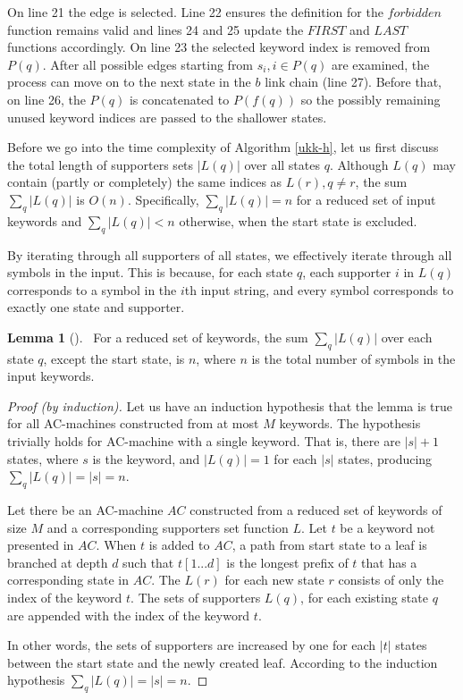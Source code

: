 \documentclass[english,twoside,censored,csm,algorithms-track-2020]{HYthesisML}
\theoremstyle{plain}
\theoremstyle{definition}
\newtheorem{lemma}[theorem]{Lemma}
\begin{document}
On line 21 the edge is selected. Line 22 ensures the definition for the $forbidden$ function
remains valid and lines 24 and 25 update the $FIRST$ and $LAST$ functions accordingly.
On line 23 the selected keyword index is removed from $P(q)$.
After all possible edges starting from
$s_i, i\in {P(q)}$ are examined, the process can move on to the next state in the $b$ link chain (line 27).
Before that, on line 26, the $P(q)$ is concatenated to $P(f(q))$ so the possibly remaining unused
keyword indices are passed to the shallower states.

Before we go into the time complexity of Algorithm \ref{ukk-h}, let us first discuss the
total length of supporters sets $|L(q)|$ over all states $q$. Although $L(q)$ may contain
(partly or completely)
the same indices as $L(r), q\neq r$, the sum $\sum_q |L(q)|$ is $O(n)$. Specifically,
$\sum_q |L(q)| = n$ for a reduced set of input keywords and $\sum_q |L(q)| < n$ otherwise,
when the start state is excluded.

By iterating
through all supporters of all states, we effectively iterate through all symbols
in the input. This is because, for each state $q$, each supporter $i$ in $L(q)$ corresponds to a
symbol in the $i$th input string, and every symbol corresponds to exactly one state and supporter.

\begin{lemma}[]~\label{lem-supporters}
  For a reduced set of keywords, the sum $\sum_q |L(q)|$ over each state $q$, except the start state,
  is $n$, where $n$ is the
  total number of symbols in the input keywords.
\end{lemma}
\begin{proof}[Proof (by induction)]
  Let us have an induction hypothesis that the lemma is true for all AC-machines constructed from 
  at most $M$ keywords. The hypothesis trivially holds for AC-machine with a single keyword. That is,
  there are $|s|+1$ states, where $s$ is the keyword, and $|L(q)| = 1$ for each $|s|$ states,
  producing $\sum_q |L(q)| = |s| = n$.

  Let there be an AC-machine $AC$ constructed from a reduced set of keywords of size $M$ and a
  corresponding supporters set function $L$. Let $t$ be a keyword not presented in $AC$.
  When $t$ is added to $AC$, a path from start state to a leaf is branched at depth $d$ such that
  $t[1...d]$ is the longest prefix of $t$ that has a corresponding state in $AC$. The $L(r)$ for
  each new state $r$ consists of only the index of the keyword $t$. The sets of supporters $L(q)$,
  for each existing state $q$ are appended with the index of the keyword $t$.

  In other words, the sets of supporters are increased by one for each $|t|$ states between
  the start state and the newly created leaf. According to the induction hypothesis
  $\sum_q |L(q)| = |s| = n$.

\end{proof}
\end{document}
